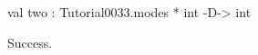 \chklistingtrue
{}
\begin{ChkListingMsg}
val two : Tutorial0033.modes * int -D-> int
\end{ChkListingMsg}
\begin{ChkListingErr}
Success.
\end{ChkListingErr}
